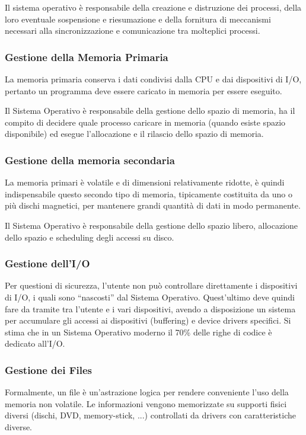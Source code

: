 \documentclass[a4]{article}
\begin{document}
Il sistema operativo è responsabile della creazione e distruzione dei processi, della loro eventuale sospensione e riesumazione e della fornitura di meccanismi necessari alla sincronizzazione e comunicazione tra molteplici processi.

\subsubsection{Gestione della Memoria Primaria}
La memoria primaria conserva i dati condivisi dalla CPU e dai dispositivi di I/O, pertanto un programma deve essere caricato in memoria per essere eseguito.

Il Sistema Operativo è responsabile della gestione dello spazio di memoria, ha il compito di decidere quale processo caricare in memoria (quando esiste spazio disponibile) ed esegue l'allocazione e il rilascio dello spazio di memoria.

\subsubsection{Gestione della memoria secondaria}
La memoria primari è volatile e di dimensioni relativamente ridotte, è quindi indispensabile questo secondo tipo di memoria, tipicamente costituita da uno o più dischi magnetici, per mantenere grandi quantità di dati in modo permanente.

Il Sistema Operativo è responsabile della gestione dello spazio libero, allocazione dello spazio e scheduling degli accessi su disco.

\subsubsection{Gestione dell'I/O}
Per questioni di sicurezza, l'utente non può controllare direttamente i dispositivi di I/O, i quali sono ``nascosti'' dal Sistema Operativo. Quest'ultimo deve quindi fare da tramite tra l'utente e i vari dispositivi, avendo a disposizione un sistema per accumulare gli accessi ai dispositivi (buffering) e device drivers specifici. Si stima che in un Sistema Operativo moderno il 70\% delle righe di codice è dedicato all'I/O.

\subsubsection{Gestione dei Files}
Formalmente, un file è un'astrazione logica per rendere conveniente l'uso della memoria non volatile. Le informazioni vengono memorizzate su supporti fisici diversi (dischi, DVD, memory-stick, ...) controllati da drivers con caratteristiche diverse.
\end{document}

